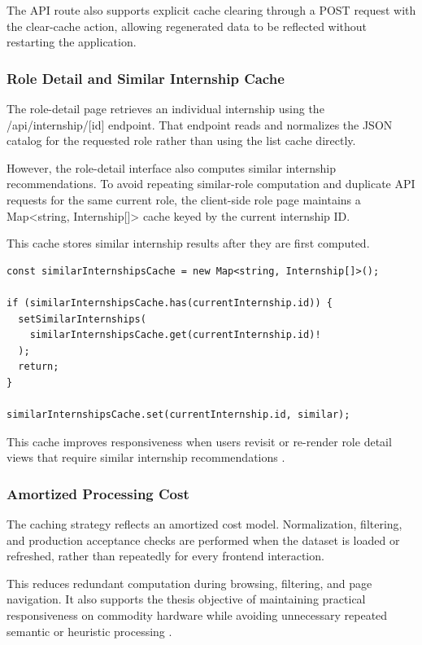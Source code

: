The API route also supports explicit cache clearing through a POST request with the clear-cache action, allowing regenerated data to be reflected without restarting the application.

\subsubsection*{Role Detail and Similar Internship Cache}

The role-detail page retrieves an individual internship using the /api/internship/[id] endpoint. That endpoint reads and normalizes the JSON catalog for the requested role rather than using the list cache directly.

However, the role-detail interface also computes similar internship recommendations. To avoid repeating similar-role computation and duplicate API requests for the same current role, the client-side role page maintains a Map<string, Internship[]> cache keyed by the current internship ID.

This cache stores similar internship results after they are first computed.

\begin{lstlisting}[caption={Client-side similar internship cache}]
const similarInternshipsCache = new Map<string, Internship[]>();

if (similarInternshipsCache.has(currentInternship.id)) {
  setSimilarInternships(
    similarInternshipsCache.get(currentInternship.id)!
  );
  return;
}

similarInternshipsCache.set(currentInternship.id, similar);
\end{lstlisting}

This cache improves responsiveness when users revisit or re-render role detail views that require similar internship recommendations \cite{smith1982cache}.

\subsubsection*{Amortized Processing Cost}

The caching strategy reflects an amortized cost model. Normalization, filtering, and production acceptance checks are performed when the dataset is loaded or refreshed, rather than repeatedly for every frontend interaction.

This reduces redundant computation during browsing, filtering, and page navigation. It also supports the thesis objective of maintaining practical responsiveness on commodity hardware while avoiding unnecessary repeated semantic or heuristic processing \cite{schwartz2020green, menghani2023efficient}.

